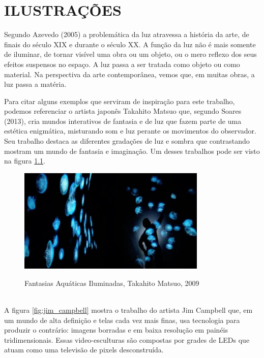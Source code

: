 %
%

\chapter{ILUSTRAÇÕES}

Segundo Azevedo (2005) a problemática da luz atravessa a história da arte, de finais do século XIX e durante o século XX. A função da luz não é mais somente de iluminar, de tornar visível uma obra ou um objeto, ou o mero reflexo dos seus efeitos suspensos no espaço. A luz passa a ser tratada como objeto ou como material. Na perspectiva da arte contemporânea, vemos que, em muitas obras, a luz passa a matéria. 

Para citar alguns exemplos que serviram de inspiração para este trabalho, podemos referenciar o artista japonês Takahito Matsuo que, segundo Soares (2013), cria mundos interativos de fantasia e de luz que fazem parte de uma estética enigmática, misturando som e luz perante os movimentos do observador.  Seu trabalho destaca as diferentes gradações de luz e sombra que contrastando mostram um mundo de fantasia e imaginação. Um desses trabalhos pode ser visto na figura \ref{fig:takahito_matsuo}.

\begin{figure}[H]
    \centering
    \caption{Fantasias Aquáticas Iluminadas, Takahito Matsuo, 2009}
	\vspace*{0,2cm}
    \includegraphics[width=0.8\textwidth]{./04-figuras/takahito_matsuo}
    \label{fig:takahito_matsuo}
\end{figure}
\vspace*{-0,9cm}
{\raggedright {}}\\

A figura \ref{fig:jim_campbell} mostra o trabalho do artista Jim Campbell que, em um mundo de alta definição e telas cada vez mais finas, usa tecnologia para produzir o contrário: imagens borradas e em baixa resolução em painéis tridimensionais. Essas video-esculturas são compostas por grades de LEDs que atuam como uma televisão de pixels desconstruída. 

